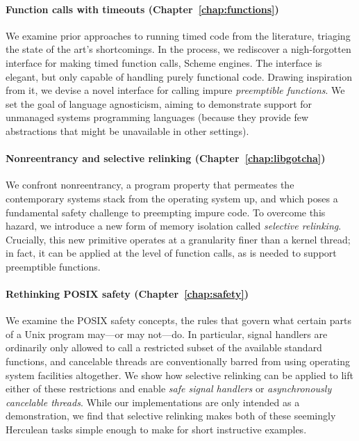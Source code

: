 \paragraph{Function calls with timeouts (Chapter~\ref{chap:functions})}
We examine prior approaches to running timed code from the literature, triaging the
state of the art's shortcomings.  In the process, we rediscover a nigh-forgotten
interface
for making timed function calls, Scheme engines.  The interface is elegant, but only
capable of handling purely functional code.  Drawing inspiration from it, we
devise a novel interface for calling impure \textit{preemptible functions}.
We set the goal of language agnosticism, aiming to demonstrate support
for unmanaged systems programming languages (because they provide few abstractions
that might be unavailable in other settings).

\paragraph{Nonreentrancy and selective relinking (Chapter~\ref{chap:libgotcha})}
We confront nonreentrancy, a program property that permeates the contemporary systems
stack from the operating system up, and which poses a fundamental safety challenge to
preempting impure code.  To overcome this hazard, we introduce a new form of memory
isolation called \textit{selective relinking}.  Crucially, this new primitive
operates at a granularity finer than a kernel thread; in fact, it can be applied at
the level of function calls, as is needed to support preemptible functions.

\paragraph{Rethinking POSIX safety (Chapter~\ref{chap:safety})}
We examine the POSIX safety concepts, the rules that govern what certain parts of a
Unix program may---or may not---do.  In particular, signal handlers are ordinarily
only allowed to call a restricted subset of the available standard functions, and
cancelable threads are conventionally barred from using operating system facilities
altogether.  We show how selective relinking can be applied to lift either of these
restrictions and enable \textit{safe signal handlers} or \textit{asynchronously
cancelable threads}.  While our implementations are only intended as a
demonstration, we find that selective relinking makes both of these seemingly
Herculean tasks simple enough to make for short instructive examples.

